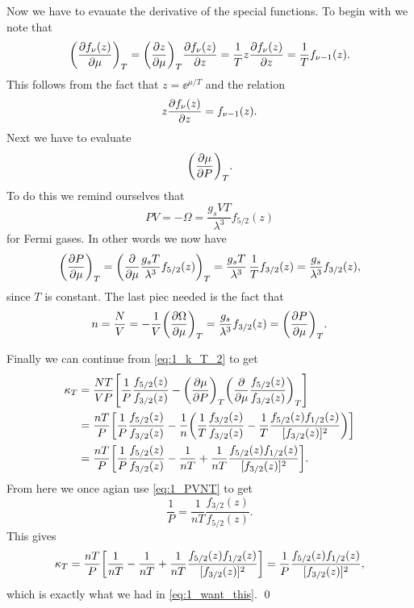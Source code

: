\documentclass[11pt,letter, swedish, english
]{article}
\begin{document}
Now we have to evauate the derivative of the special functions. To
begin with we note that
\begin{equation}
\qty(\pdv{f_\nu(z)}{\mu})_T=\qty(\pdv{z}{\mu})_T\pdv{f_\nu(z)}{z}
= \frac{1}{T}z\pdv{f_\nu(z)}{z}=\frac{1}{T}f_{\nu-1}(z).
\end{equation}
This follows from the fact that $z=\ee^{\mu/T}$ and the relation
\begin{equation}
z\pdv{f_\nu(z)}{z} = f_{\nu-1}(z).
\end{equation}
Next we have to evaluate
\begin{equation}
\qty(\pdv{\mu}{P})_T.
\end{equation}
To do this we remind ourselves that
\begin{equation}
PV=-\Omega=\frac{g_sVT}{\lambda^3}f_{5/2}(z)
\end{equation}
for Fermi gases. In other words we now have
\begin{equation}
\qty(\pdv{P}{\mu})_T 
=\qty(\pdv{\mu} \frac{g_sT}{\lambda^3}f_{5/2}(z))_T 
=\frac{g_sT}{\lambda^3} \,\frac{1}{T}f_{3/2}(z) 
=\frac{g_s}{\lambda^3} f_{3/2}(z),
\end{equation}
since $T$ is constant. 
The last piec needed is the fact that
\begin{equation}
n=\frac{N}{V}=-\frac{1}{V}\qty(\pdv{\Omega}{\mu})_T
=\frac{g_s}{\lambda^3} f_{3/2}(z)=\qty(\pdv{P}{\mu})_T.
\end{equation}

Finally we can continue from \eqref{eq:1_k_T_2} to get
\begin{equation}
\begin{aligned}
\kappa_T &= \frac{NT}{VP} \qty[
\frac{1}{P}\frac{f_{5/2}(z)}{f_{3/2}(z)}
-\qty(\pdv{\mu}{P})_T\qty(\pdv{\mu}\frac{f_{5/2}(z)}{f_{3/2}(z)})_T
]\\
&= \frac{nT}{P} \qty[
\frac{1}{P}\frac{f_{5/2}(z)}{f_{3/2}(z)}
-\frac{1}{n}\qty(\frac{1}{T}\frac{f_{3/2}(z)}{f_{3/2}(z)}
-\frac{1}{T}\frac{f_{5/2}(z)f_{1/2}(z)}{[f_{3/2}(z)]^2}
)]\\
&= \frac{nT}{P} \qty[
\frac{1}{P}\frac{f_{5/2}(z)}{f_{3/2}(z)}
-\frac{1}{nT}
+\frac{1}{nT}\frac{f_{5/2}(z)f_{1/2}(z)}{[f_{3/2}(z)]^2}
].
\end{aligned}
\end{equation}
From here we once agian use \eqref{eq:1_PVNT} to get
\begin{equation}
\frac{1}{P}=\frac{1}{nT}\frac{f_{3/2}(z)}{f_{5/2}(z)}.
\end{equation}
This gives
\begin{equation}
\kappa_T = \frac{nT}{P} \qty[
\frac{1}{nT}
-\frac{1}{nT}
+\frac{1}{nT}\frac{f_{5/2}(z)f_{1/2}(z)}{[f_{3/2}(z)]^2}
]
=\frac{1}{P}\frac{f_{5/2}(z)f_{1/2}(z)}{[f_{3/2}(z)]^2},
\end{equation}
which is exactly what we had in \eqref{eq:1_want_this}. 
\qed
\end{document}
